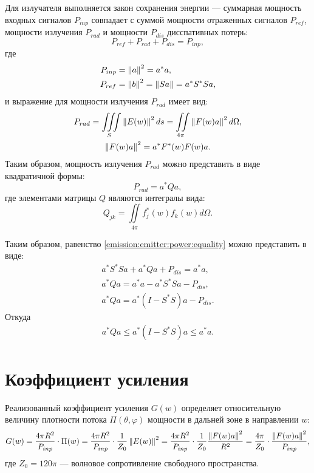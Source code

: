 Для излучателя выполняется закон сохранения энергии --- суммарная мощность входных сигналов $P_{inp}$ совпадает с суммой мощности отраженных сигналов $P_{ref}$,
мощности излучения $P_{rad}$ и мощности $P_{dis}$ дисспативных потерь:
\begin{equation}
    \label{emission:emitter:power:equality}
    P_{ref} + P_{rad} + P_{dis} = P_{inp} ,
\end{equation}
где
\begin{align}
    P_{inp} & = \left \| a \right \|^2 = a^* a , \label{emission:emitter:power:input}\\
    P_{ref} & = \left \| b \right \|^2 = \left \| S a \right \| = a^* S^* S a \notag,
\end{align}
и выражение для мощности излучения $P_{rad}$ имеет вид:
\begin{gather*}
    P_{rad}
    = \iiint \limits_S \left \| E(w) \right \|^2 ds
    = \iint \limits_{4 \pi} \left \| F(w) a \right \|^2 d \Omega , \\
    \left \| F(w) a \right \|^2
    = a^* F^*(w) F(w) a .
\end{gather*}
Таким образом, мощность излучения $P_{rad}$ можно представить в виде квадратичной формы:
\begin{equation}
    \label{emission:emitter:power:radiated}
    P_{rad}
    = a^* Q a ,
\end{equation}
где элементами матрицы $Q$ являются интегралы вида:
\[
    Q_{jk} = \iint \limits_{4 \pi} f_j^*(w) f_k(w) d \Omega .
\]

Таким образом, равенство \eqref{emission:emitter:power:equality} можно представить в виде:
\begin{gather*}
    a^* S^* S a + a^* Q a + P_{dis} = a^* a , \\
    a^* Q a = a^* a - a^* S^* S a - P_{dis}, \\
    a^* Q a = a^* ( I - S^* S ) a - P_{dis} .
\end{gather*}
Откуда
\begin{gather*} \label{emission:emitter:power:inequality}
    a^* Q a \le a^* ( I - S^* S ) a \le a^* a.
\end{gather*}


\section{Коэффициент усиления}

Реализованный коэффициент усиления $G(w)$ определяет относительную величину плотности потока $\Pi(\theta, \varphi)$ мощности в дальней зоне в
направлении $w$:
\[
    G(w)
    = \frac{4 \pi R^2}{P_{inp}} \cdot \Pi(w)
    = \frac{4 \pi R^2}{P_{inp}} \cdot \frac{1}{Z_0} \left \| E(w) \right \|^2
    = \frac{4 \pi R^2}{P_{inp}} \cdot \frac{1}{Z_0} \frac{\left \| F(w) a \right \|^2}{R^2}
    = \frac{4 \pi}{Z_0} \cdot \frac{\left \| F(w) a \right \|^2}{P_{inp}} ,
\]
где $Z_0 = 120 \pi$ --- волновое сопротивление свободного пространства.

